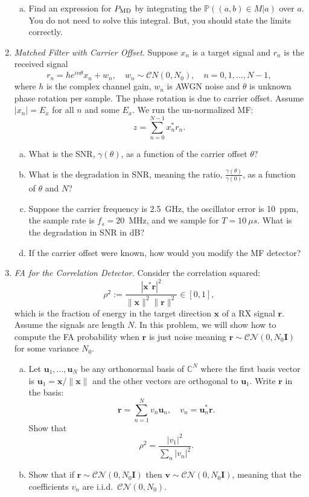 \documentclass[11pt]{article}
\def\CNorm{{\mathcal{CN}}}
\def\C{{\mathbb{C}}}
\def\Prob{{\mathbb{P}}}
\newcommand{\mb}[1]{\boldsymbol{#1}}
\newcommand{\rbf}{\boldsymbol{r}}
\newcommand{\ubf}{\boldsymbol{u}}
\newcommand{\vbf}{\boldsymbol{v}}
\newcommand{\xbf}{\boldsymbol{x}}
\begin{document}
\begin{enumerate}
\begin{enumerate}[(a)]
\item Find an expression for $P_{\rm MD}$ by integrating the $\Prob((a,b) \in M | a)$ over $a$.
You do not need to solve this integral.  But, you should state the limits correctly.
\end{enumerate}


\item \emph{Matched Filter with Carrier Offset}.
Suppose $x_n$ is a target signal and $r_n$ is the received signal
\[
    r_n = he^{in\theta}x_n + w_n, \quad w_n \sim {\mathcal CN}(0,N_0),
    \quad n=0,1,\ldots,N-1,
\]
where $h$ is the complex channel gain, $w_n$ is AWGN noise
and $\theta$ is unknown phase rotation per sample.
The phase rotation is due to carrier offset.
Assume $|x_n|=E_x$ for all $n$ and some $E_x$.  We run the un-normalized MF:
\[
    z = \sum_{n=0}^{N-1} x_n^*r_n.
\]
\begin{enumerate}[(a)]
\item What is the SNR, $\gamma(\theta)$, as a function of the carrier offset $\theta$?

\item What is the degradation in
SNR, meaning the ratio, $\frac{\gamma(\theta)}{\gamma(0)}$,
as a function of $\theta$ and $N$?

\item Suppose the carrier frequency is \SI{2.5}{GHz},  the oscillator error is
\SI{10}{ppm}, the sample rate is $f_s = 20$\, \si{MHz}, and we sample for $T=10~\mu s$.  
What is the degradation in SNR in dB?

\item If the carrier offset were known, how would you modify the MF detector?
\end{enumerate}

\item \emph{FA for the Correlation Detector.}  Consider the correlation
squared:
\[
    \rho^2 := \frac{|\xbf^*\rbf|^2}{\|\xbf\|^2\|\rbf\|^2} \in [0,1],
\]
which is the fraction of energy in the target direction $\xbf$ 
of a RX signal $\rbf$.  Assume the signals are length $N$.
In this problem, we will show how to compute the FA probability
when $\rbf$ is just noise meaning $\rbf \sim \CNorm(0,N_0 \mb{I})$
for some variance $N_0$.
\begin{enumerate}[(a)]
\item Let $\ubf_1,\ldots,\ubf_N$ be any orthonormal basis of $\C^N$ where
the first basis vector is 
$\ubf_1 = \xbf/\|\xbf\|$ and the other vectors are orthogonal to $\ubf_1$.
Write $\rbf$ in the basis:
\[
    \rbf = \sum_{n=1}^N v_n \ubf_n, \quad v_n = \ubf_n^*\rbf.
\]
Show that
\[
    \rho^2 = \frac{|v_1|^2}{\sum_n |v_n|^2}.
\]
\item Show that if $\rbf \sim \CNorm(0,N_0\mb{I})$ then $\vbf \sim \CNorm(0,N_0\mb{I})$,
meaning that the coefficients $v_n$ are i.i.d.~$\CNorm(0,N_0)$.


\end{enumerate}
\end{enumerate}
\end{document}
